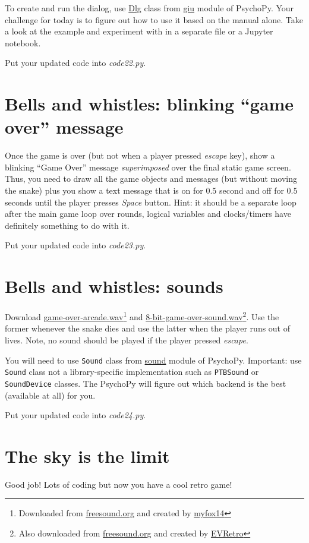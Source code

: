 \documentclass[
]{book}
\begin{document}
To create and run the dialog, use \href{https://www.psychopy.org/api/gui.html\#dlg}{Dlg} class from
\href{https://www.psychopy.org/api/gui.html}{giu} module of PsychoPy. Your challenge for today is to figure out how to use it based on the manual alone. Take a look at the example and experiment with in a separate file or a Jupyter notebook.

Put your updated code into \emph{code22.py}.

\hypertarget{bells-and-whistles-blinking-game-over-message}{%
\section{Bells and whistles: blinking ``game over'' message}\label{bells-and-whistles-blinking-game-over-message}}

Once the game is over (but not when a player pressed \emph{escape} key), show a blinking ``Game Over'' message \emph{superimposed} over the final static game screen. Thus, you need to draw all the game objects and messages (but without moving the snake) plus you show a text message that is on for 0.5 second and off for 0.5 seconds until the player presses \emph{Space} button. Hint: it should be a separate loop after the main game loop over rounds, logical variables and clocks/timers have definitely something to do with it.

Put your updated code into \emph{code23.py}.

\hypertarget{bells-and-whistles-sounds}{%
\section{Bells and whistles: sounds}\label{bells-and-whistles-sounds}}

Download \href{material/game-over-arcade.wav}{game-over-arcade.wav}\footnote{Downloaded from \href{https://freesound.org/}{freesound.org} and created by \href{https://freesound.org/people/myfox14/}{myfox14}} and \href{material/8-bit-game-over-sound.wav}{8-bit-game-over-sound.wav}\footnote{Also downloaded from \href{https://freesound.org/}{freesound.org} and created by \href{https://freesound.org/people/EVRetro/}{EVRetro}}. Use the former whenever the snake dies and use the latter when the player runs out of lives. Note, no sound should be played if the player pressed \emph{escape}.

You will need to use \texttt{Sound} class from \href{https://psychopy.org/api/sound/playback.html}{sound} module of PsychoPy. Important: use \texttt{Sound} class not a library-specific implementation such as \texttt{PTBSound} or \texttt{SoundDevice} classes. The PsychoPy will figure out which backend is the best (available at all) for you.

Put your updated code into \emph{code24.py}.

\hypertarget{the-sky-is-the-limit}{%
\section{The sky is the limit}\label{the-sky-is-the-limit}}

Good job! Lots of coding but now you have a cool retro game!

  
\end{document}
